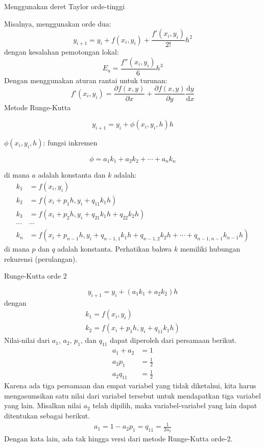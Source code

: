 Menggunakan deret Taylor orde-tinggi

Misalnya, menggunakan orde dua:
\begin{equation*}
y_{i+1} = y_{i} + f(x_i, y_i) + \frac{f'(x_i, y_i)}{2!}h^2
\end{equation*}
dengan kesalahan pemotongan lokal:
\begin{equation*}
E_{a} = \frac{f''(x_i, y_i)}{6} h^3
\end{equation*}
Dengan menggunakan aturan rantai untuk turunan:
\begin{equation*}
f'(x_i, y_i) = \frac{\partial f(x,y)}{\partial x} +
\frac{\partial f(x,y)}{\partial y}\frac{\mathrm{d}y}{\mathrm{d}x}
\end{equation*}
Metode Runge-Kutta

\begin{equation*}
y_{i+1} = y_{i} + \phi(x_i, y_i, h) h
\end{equation*}

$\phi(x_i, y_i, h)$: fungsi inkremen

\begin{equation*}
\phi = a_1 k_1 + a_2 k_2 + \cdots + a_n k_n
\end{equation*}

di mana $a$ adalah konstanta dan $k$ adalah:
\begin{align*}
k_1 & = f(x_i, y_i) \\
k_2 & = f(x_i + p_1 h, y_i + q_{11} k_1 h ) \\
k_3 & = f(x_i + p_2 h, y_i + q_{21} k_1 h + q_{22} k_2 h) \\
\cdots & \cdots \\
k_n & = f(x_i + p_{n-1}h, y_i + q_{n-1,1} k_1 h + q_{n-1,2} k_2 h + \cdots + q_{n-1,n-1} k_{n-1} h)
\end{align*}
di mana $p$ dan $q$ adalah konstanta.
Perhatikan bahwa $k$ memiliki hubungan rekurensi (perulangan).

Runge-Kutta orde 2

\begin{equation*}
y_{i+1} = y_i + (a_1 k_1 + a_2 k_2) h
\end{equation*}
dengan
\begin{align*}
k_1 = f(x_i, y_i) \\
k_2 = f(x_i + p_1 h, y_i + q_{11} k_1 h)
\end{align*}
Nilai-nilai dari $a_1$, $a_2$, $p_1$, dan $q_{11}$ dapat diperoleh dari persamaan
berikut.
\begin{align*}
a_1 + a_2  & = 1 \\
a_2 p_1    & = \frac{1}{2} \\
a_2 q_{11} & = \frac{1}{2}
\end{align*}
Karena ada tiga persamaan dan empat variabel yang tidak diketahui, kita harus mengasumsikan satu
nilai dari variabel tersebut untuk mendapatkan tiga variabel yang lain.
Misalkan nilai $a_2$ telah dipilih, maka variabel-variabel yang lain
dapat ditentukan sebagai berikut.
\begin{align*}
a_1 = 1 - a_2
p_1 = q_{11} = \frac{1}{2a_2}
\end{align*}
Dengan kata lain, ada tak hingga versi dari metode Runge-Kutta orde-2.


